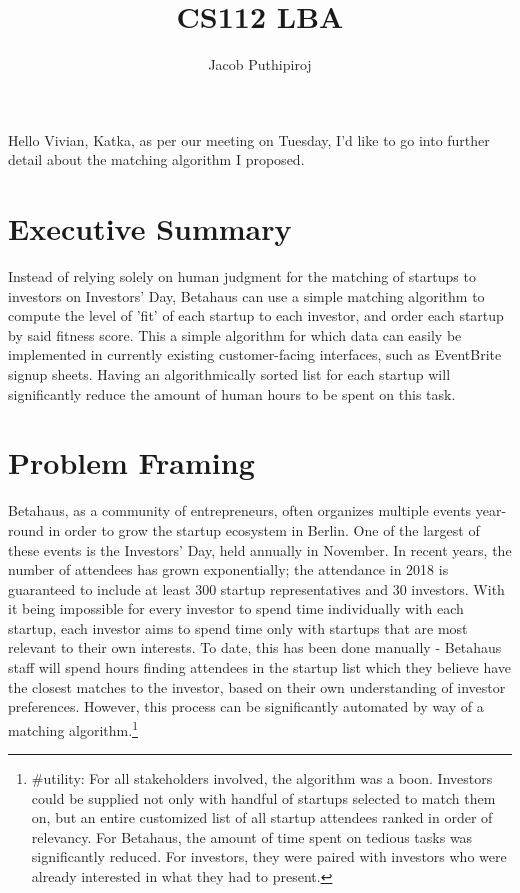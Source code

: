 \documentclass{article}
\begin{document}
\title{CS112 LBA}
\author{Jacob Puthipiroj}
\date{}
\maketitle

Hello Vivian, Katka, as per our meeting on Tuesday, I'd like to go into further detail about the matching algorithm I proposed.

\section*{Executive Summary}
Instead of relying solely on human judgment for the matching of startups to investors on Investors' Day, Betahaus can use a simple matching algorithm to compute the level of 'fit' of each startup to each investor, and order each startup by said fitness score. This a simple algorithm for which data can easily be implemented in currently existing customer-facing interfaces, such as EventBrite signup sheets. Having an algorithmically sorted list for each startup will significantly reduce the amount of human hours to be spent on this task.

\section*{Problem Framing}
Betahaus, as a community of entrepreneurs, often organizes multiple events year-round in order to grow the startup ecosystem in Berlin. One of the largest of these events is the Investors' Day, held annually in November. In recent years, the number of attendees has grown exponentially; the attendance in 2018 is guaranteed to include at least 300 startup representatives and 30 investors. With it being impossible for every investor to spend time individually with each startup, each investor aims to spend time only with startups that are most relevant to their own interests. To date, this has been done manually - Betahaus staff will spend hours finding attendees in the startup list which they believe have the closest matches to the investor, based on their own understanding of investor preferences. However, this process can be significantly automated by way of a matching algorithm.\footnote{\#utility: For all stakeholders involved, the algorithm was a boon. Investors could be supplied not only with handful of startups selected to match them on, but an entire customized list of all startup attendees ranked in order of relevancy. For Betahaus, the amount of time spent on tedious tasks was significantly reduced. For investors, they were paired with investors who were already interested in what they had to present.}
 
\end{document}
